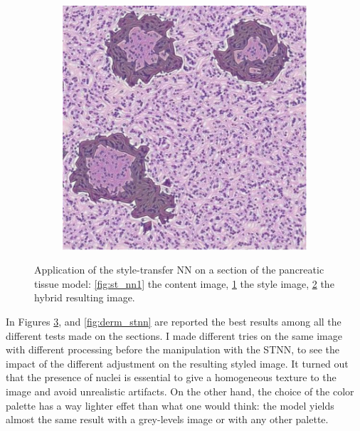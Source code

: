 \begin{description}
\begin{figure}
\begin{subfigure}[t]{0.3\textwidth}
                 \caption{}
                 \label{fig:st_nn2}
            \end{subfigure}
            \quad
            \begin{subfigure}[t]{0.3\textwidth}
                 \centering
                 \includegraphics[width = \textwidth]{images/st_nn3}
                 \caption{}
                 \label{fig:st_nn3}
            \end{subfigure}
            \caption{Application of the style-transfer NN on a section of the pancreatic tissue model: \ref{fig:st_nn1} the content image, \ref{fig:st_nn2} the style image, \ref{fig:st_nn3} the hybrid resulting image.}
            \label{fig:panc_stnn}
        \end{figure}

        In Figures \ref{fig:panc_stnn}, and \ref{fig:derm_stnn} are reported the best results among all the different tests made on the sections. I made different tries on the same image with different processing before the manipulation with the STNN, to see the impact of the different adjustment on the resulting styled image. It turned out that the presence of nuclei is essential to give a homogeneous texture to the image and avoid unrealistic artifacts. On the other hand, the choice of the color palette has a way lighter effet than what one would think: the model yields almost the same result with a grey-levels image or with any other palette.


\end{description}
